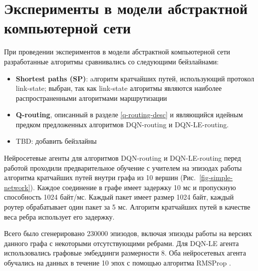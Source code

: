 \documentclass[specification,annotation,times]{itmo-student-thesis}
\theoremstyle{definition}
\begin{document}
\section{Эксперименты в модели абстрактной компьютерной сети}\label{experiments:network}

При проведении экспериментов в модели абстрактной компьютерной сети разработанные алгоритмы
сравнивались со следующими бейзлайнами:

\begin{itemize}
  \item \textbf{Shortest paths (SP)}: aлгоритм кратчайших путей, использующий
    протокол link-state; выбран, так как link-state алгоритмы являются наиболее
    распространенными алгоритмами маршрутизации
  \item \textbf{Q-routing}, описанный в разделе \ref{q-routing-desc} и
    являющийся идейным предком предложенных алгоритмов DQN-routing и DQN-LE-routing.
  \item TBD: добавить бейзлайны
\end{itemize}

Нейросетевые агенты для алгоритмов DQN-routing и DQN-LE-routing перед работой
проходили предварительное обучение с учителем на эпизодах работы алгоритма
кратчайших путей внутри графа из 10 вершин (Рис.~\ref{fig-simple-network}).
Каждое соединение в графе имеет задержку 10 мс и пропускную способность 1024 байт/мс.
Каждый пакет имеет размер 1024 байт, каждый роутер обрабатывает один пакет за 5
мс. Алгоритм кратчайших путей в качестве веса ребра использует его задержку.

Всего было сгенерировано 230000 эпизодов, включая эпизоды работы на версиях
данного графа с некоторыми отсутствующими ребрами. Для DQN-LE агента
использовались графовые эмбеддинги размерности 8. Оба нейросетевых агента
обучались на данных в течение 10 эпох с помощью алгоритма RMSProp \cite{tieleman2012lecture}.
\end{document}
